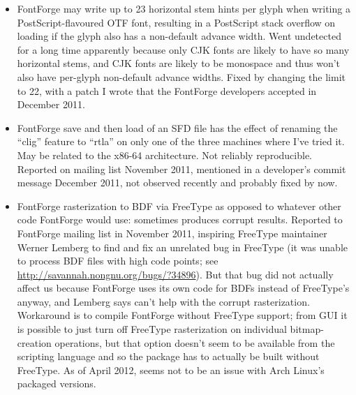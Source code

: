 \documentclass[14pt]{extarticle}
\begin{document}
\begin{itemize}
  \item FontForge may write up to 23 horizontal stem hints per glyph when
    writing a PostScript-flavoured OTF font, resulting in a PostScript stack
    overflow on loading if the glyph also has a non-default advance width. 
    Went undetected for a long time apparently because only CJK fonts are
    likely to have so many horizontal stems, and CJK fonts are likely to
    be monospace and thus won't also have per-glyph non-default advance
    widths.  Fixed by changing the limit to 22, with a patch I wrote that
    the FontForge developers accepted in December 2011.

  \item FontForge save and then load of an SFD file has the effect of
    renaming the ``clig'' feature to ``rtla'' on only one of the three
    machines where I've tried it.  May be related to the x86-64
    architecture.  Not reliably reproducible.  Reported on mailing list
    November 2011, mentioned in a developer's commit message December 2011,
    not observed recently and probably fixed by now.

  \item FontForge rasterization to BDF via FreeType as opposed to whatever
    other code FontForge would use:  sometimes produces corrupt results. 
    Reported to FontForge mailing list in November 2011, inspiring FreeType
    maintainer Werner Lemberg to find and fix an unrelated bug in FreeType
    (it was unable to process BDF files with high code points; see
    \url{http://savannah.nongnu.org/bugs/?34896}).  But that bug did not
    actually affect us because FontForge uses its own code for BDFs instead
    of FreeType's anyway, and Lemberg says can't help with the corrupt
    rasterization.  Workaround is to compile FontForge without FreeType
    support; from GUI it is possible to just turn off FreeType rasterization
    on individual bitmap-creation operations, but that option doesn't seem
    to be available from the scripting language and so the package has to
    actually be built without FreeType.  As of April 2012, seems not to
    be an issue with Arch Linux's packaged versions.


\end{itemize}
\end{document}
